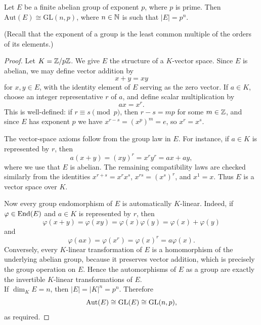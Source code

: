 \documentclass[../Odyssey_Project.tex]{subfiles}
\begin{document}
\begin{proposition}
\label{prop:4.1}
Let $E$ be a finite abelian group of exponent $p$, where $p$ is prime. Then $\mathrm{Aut}(E) \cong \mathrm{GL}(n, p)$, where $n \in \mathbb{N}$ is such that $|E| = p^n$.
\end{proposition}
(Recall that the exponent of a group is the least common multiple of the orders of its elements.)
\begin{proof}
Let $K = \mathbb{Z}/p\mathbb{Z}$. We give $E$ the structure of a $K$-vector space. Since $E$ is abelian, we may define vector addition by
\[
    x + y = xy
\]
for $x, y \in E$, with the identity element of $E$ serving as the zero vector. If $a \in K$, choose an integer representative $r$ of $a$, and define scalar multiplication by
\[
    a x = x^r.
\]
This is well-defined: if $r \equiv s \pmod p$, then $r - s = mp$ for some $m \in \mathbb{Z}$, and since $E$ has exponent $p$ we have $x^{r-s} = (x^p)^m = e$, so $x^r = x^s$.

The vector-space axioms follow from the group law in $E$. For instance, if $a \in K$ is represented by $r$, then
\[
    a(x+y) = (xy)^r = x^r y^r = ax + ay,
\]
where we use that $E$ is abelian. The remaining compatibility laws are checked similarly from the identities $x^{r+s} = x^r x^s$, $x^{rs} = (x^s)^r$, and $x^1=x$. Thus $E$ is a vector space over $K$.

Now every group endomorphism of $E$ is automatically $K$-linear. Indeed, if $\varphi \in \operatorname{End}(E)$ and $a \in K$ is represented by $r$, then
\[
    \varphi(x+y) = \varphi(xy) = \varphi(x)\varphi(y) = \varphi(x)+\varphi(y)
\]
and
\[
    \varphi(ax) = \varphi(x^r) = \varphi(x)^r = a\varphi(x).
\]
Conversely, every $K$-linear transformation of $E$ is a homomorphism of the underlying abelian group, because it preserves vector addition, which is precisely the group operation on $E$. Hence the automorphisms of $E$ as a group are exactly the invertible $K$-linear transformations of $E$.\\
If $\dim_K E = n$, then $|E| = |K|^n = p^n$. Therefore
\[
    \operatorname{Aut}(E) \cong \operatorname{GL}(E) \cong \operatorname{GL}(n,p),
\]
as required.
\end{proof}
\end{document}
